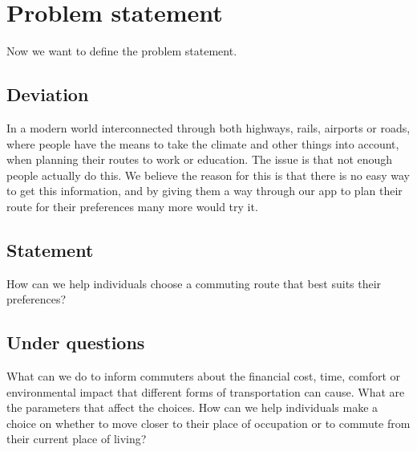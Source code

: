 \chapter{Problem statement}\label{ch:problem-statement}

Now we want to define the problem statement.


\section{Deviation}\label{sec:deviation}

In a modern world interconnected through both highways, rails, airports or roads, where people have the means to take
the climate and other things into account, when planning their routes to work or education.
The issue is that not enough people actually do this.
We believe the reason for this is that there is no easy way to get this information, and by giving them a way through
our app to plan their route for their preferences many more would try it.



\section{Statement}\label{sec:statement}

How can we help individuals choose a commuting route that best suits their preferences?



\section{Under questions}\label{sec:under-questions}

What can we do to inform commuters about the financial cost, time, comfort or environmental impact that different forms
of transportation can cause.
What are the parameters that affect the choices.
How can we help individuals make a choice on whether to move closer to their place of occupation or to commute from
their current place of living?
